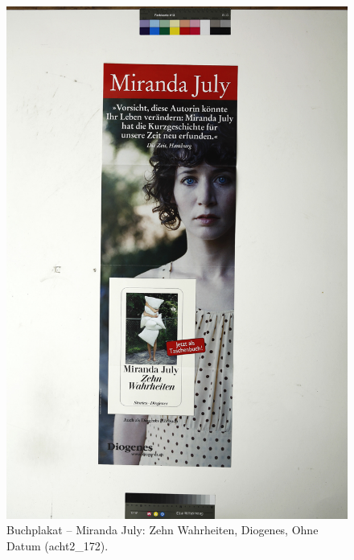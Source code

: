 \documentclass[a4paper,12pt,ngerman]{article}
\begin{document}
\newpage
\begin{figure}[ht]
\includegraphics[width=\linewidth]{Abbildung_13_(acht2_172)}
\centering
\caption{Buchplakat – Miranda July: Zehn Wahrheiten, Diogenes, Ohne Datum (acht2\_172).}
\end{figure}
\end{document}
